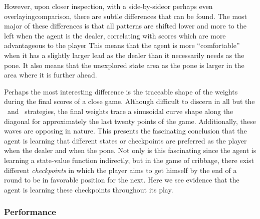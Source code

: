 However, upon closer inspection,
with a side-by-side\textemdash or perhaps even overlaying\textemdash comparison,
there are subtle differences that can be found.
%
The most major of these differences is that all patterns are shifted lower and
more to the left when the agent is the dealer,
correlating with scores which are more advantageous to the player
%
This means that the agent is more ``comfortable'' when it has a slightly larger
lead as the dealer than it necessarily needs as the pone.
%
It also means that the unexplored state area as the pone is larger in the area
where it is further ahead.
%



Perhaps the most interesting difference is the traceable shape of the weights
during the final scores of a close game.
%
Although difficult to discern in all but the \handmaxmin\ and \handmaxavg\ 
strategies,
the final weights trace a sinusoidal curve shape along the diagonal
for approximately the last twenty points of the game.
%
Additionally,
these waves are opposing in nature.
%
This presents the fascinating conclusion that the agent is learning
that different states or checkpoints are preferred as the player when
the dealer and when the pone.
%
Not only is this fascinating since the agent is learning a state-value function
indirectly,
but in the game of cribbage,
there exist different \textit{checkpoints} in which the player aims to get
himself by the end of a round to be in favorable position for the next.
%
Here we see evidence that the agent is learning these checkpoints throughout its
play.


\subsubsection{Performance}

